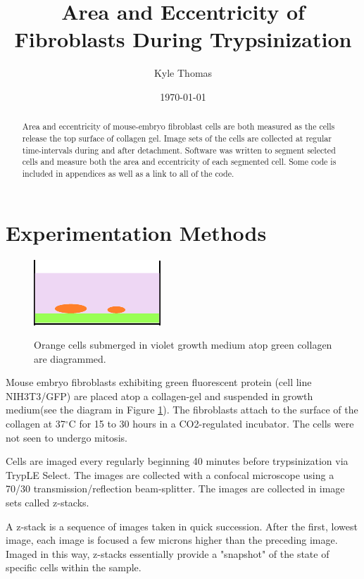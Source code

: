 \documentclass[ twocolumn,notitlepage]{ revtex4-1}
\begin{document}
\title{Area and Eccentricity of Fibroblasts During Trypsinization}\author{Kyle Thomas}\date{\today}\maketitle

\begin{abstract}
\begin{center}
Area and eccentricity of mouse-embryo fibroblast cells are both measured as the cells release the top surface of collagen gel. Image sets of the cells are collected at regular time-intervals during and after detachment. Software was written to segment selected cells and measure both the area and eccentricity of each segmented cell. Some code is included in appendices as well as a link to all of the code.
\end{center}
\end{abstract}

\section*{Experimentation Methods}
\begin{figure}
  \centering
  \caption{Orange cells submerged in violet growth medium atop green collagen are diagrammed.}
  \includegraphics[clip=true,width=.4\textwidth]{img/cells-diagram}
  \label{fig:cellDiagram}
\end{figure}

Mouse embryo fibroblasts exhibiting green fluorescent protein (cell line NIH3T3/GFP) are placed atop a collagen-gel and suspended in growth medium(see the diagram in Figure \ref{fig:cellDiagram}). The fibroblasts attach to the surface of the collagen at 37$^\circ$C for 15 to 30 hours in a CO2-regulated incubator. The cells were not seen to undergo mitosis.

Cells are imaged every regularly beginning 40 minutes before trypsinization via TrypLE Select. The images are collected with a confocal microscope using a 70/30 transmission/reflection beam-splitter. The images are collected in image sets called z-stacks.

A z-stack is a sequence of images taken in quick succession. After the first, lowest image, each image is focused a few microns higher than the preceding image. Imaged in this way, z-stacks essentially provide a "snapshot" of the state of specific cells within the sample.
\end{document}
